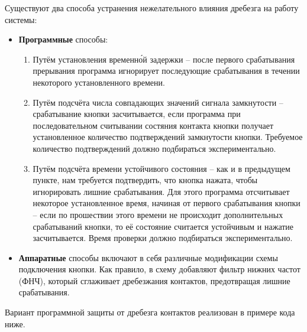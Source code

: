 \documentclass[../sparc.tex]{subfiles}
\begin{document}
Существуют два способа устранения нежелательного влияния дребезга на работу
системы:
\begin{itemize}
\item \textbf{Программные} способы:
  \begin{enumerate}
  \item Путём установления временн\'ой задержки -- после первого срабатывания
    прерывания программа игнорирует последующие срабатывания в течении
    некоторого установленного времени.
  \item Путём подсчёта числа совпадающих значений сигнала замкнутости --
    срабатывание кнопки засчитывается, если программа при последовательном
    считывании состяния контакта кнопки получает установленное количество
    подтверждений замкнутости кнопки.  Требуемое количество подтверждений должно
    подбираться экспериментально.
  \item Путём подсчёта времени устойчивого состояния -- как и в предыдущем
    пункте, нам требуется подтвердить, что кнопка нажата, чтобы игнорировать
    лишние срабатывания.  Для этого программа отсчитывает некоторое
    установленное время, начиная от первого срабатывания кнопки -- если по
    прошествии этого времени не происходит дополнительных срабатываний кнопки,
    то её состояние считается устойчивым и нажатие засчитывается.  Время
    проверки должно подбираться экспериментально.
  \end{enumerate}
\item \textbf{Аппаратные} способы включают в себя различные модификации схемы
  подключения кнопки.  Как правило, в схему добавляют фильтр нижних частот
  (ФНЧ), который сглаживает дребезжания контактов, предотвращая лишние
  срабатывания.
\end{itemize}

Вариант программной защиты от дребезга контактов реализован в примере кода ниже.
\end{document}
